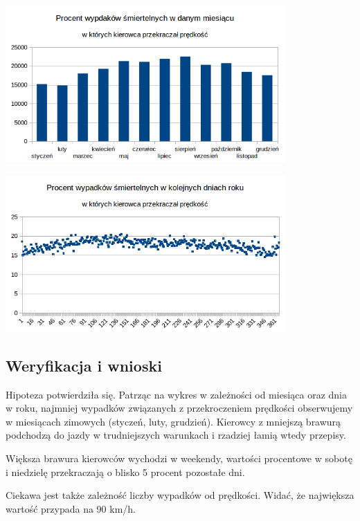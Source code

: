 \centerline{\includegraphics[width=0.8\textwidth]{images/hipotheses/speed/speed_exceeded_by_month.png}}

\centerline{\includegraphics[width=0.8\textwidth]{images/hipotheses/speed/speed_exceeded_by_day_of_year.png}}

\subsection{Weryfikacja i wnioski}\label{weryfikacja-i-wnioski}

Hipoteza potwierdziła się. Patrząc na wykres w zależności od miesiąca
oraz dnia w roku, najmniej wypadków związanych z przekroczeniem
prędkości obserwujemy w miesiącach zimowych (styczeń, luty, grudzień).
Kierowcy z mniejszą brawurą podchodzą do jazdy w trudniejszych warunkach
i rzadziej łamią wtedy przepisy.

Większa brawura kierowców wychodzi w weekendy, wartości procentowe w
sobotę i niedzielę przekraczają o blisko 5 procent pozostałe dni.

Ciekawa jest także zależność liczby wypadków od prędkości. Widać, że
największa wartość przypada na 90 km/h.
